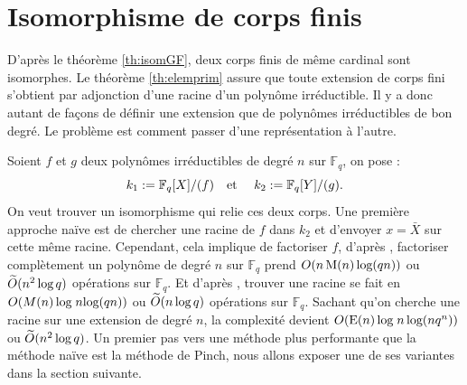 \documentclass[a4paper]{article} %
\numberwithin{section}{part}
\numberwithin{equation}{section}
\newcommand\GF[1]{\mathbb{F}_{#1}}
\newcommand\etmath{\textup{\quad et \quad}}
\newcommand\M[1]{\textup{M}(#1)}
\newcommand\E[1]{\textup{E}(#1)}
\newcommand\tO[1]{\widetilde{O}(#1)}
\begin{document}
\part{Isomorphisme de corps finis}
\label{deux}
D'après le théorème \ref{th:isomGF}, deux corps finis de même cardinal sont
isomorphes. Le théorème \ref{th:elemprim} assure que toute extension de corps 
fini s'obtient par adjonction d'une racine d'un polynôme irréductible. Il y
a donc autant de façons de définir une extension que de polynômes 
irréductibles de bon degré. Le problème est comment passer d'une représentation
à l'autre.\par
Soient $f$ et $g$ deux polynômes irréductibles de degré $n$ sur $\GF{q}$, on
pose :
\begin{equation}
k_1 := \GF{q}[X]/(f) \etmath k_2 := \GF{q}[Y]/(g). 
\end{equation}
On veut trouver un isomorphisme qui relie ces deux corps. Une première approche 
naïve est de chercher une racine de $f$ dans $k_2$ et d'envoyer $x = \bar{X}$ 
sur cette même racine. Cependant, cela implique de factoriser $f$, d'après 
\cite[th. 14.14]{GaGe}, factoriser complètement un polynôme de degré $n$ sur 
$\GF{q}$ prend $O(n\,\M{n}\,\textup{log}(qn))$ ou $\tO{n^2\,\textup{log\,}q}$
opérations sur $\GF{q}$. Et d'après \cite[cor. 14.16]{GaGe}, trouver une racine 
se fait en $O(M(n)\,\textup{log\;}n\textup{log}(qn))$ ou 
$\tO{n\,\textup{log\,}q}$ opérations sur $\GF{q}$. Sachant qu'on cherche une 
racine sur une extension de degré $n$, la complexité devient 
$O(\E{n}\,\textup{log\;}n\,\textup{log}(nq^n))$ ou $\tO{n^2\,\textup{log\,}q}$.
Un premier pas vers une méthode plus performante que la méthode naïve est la 
méthode de Pinch, nous allons exposer une de ses variantes dans la section 
suivante.
\end{document}
